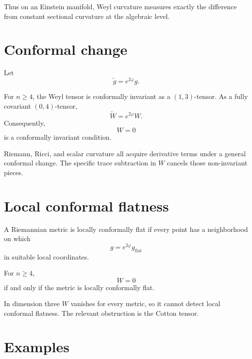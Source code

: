 Thus on an Einstein manifold, Weyl curvature measures exactly the difference from
constant sectional curvature at the algebraic level.

\section{Conformal change}

Let
\[
\widetilde g=e^{2\varphi}g.
\]

\begin{theorem}\label{thm:vii28-conformal}
For \(n\ge4\), the Weyl tensor is conformally invariant as a \((1,3)\)-tensor.
As a fully covariant \((0,4)\)-tensor,
\[
\widetilde W=e^{2\varphi}W.
\]
Consequently,
\[
W=0
\]
is a conformally invariant condition.
\end{theorem}

\begin{remark}
Riemann, Ricci, and scalar curvature all acquire derivative terms under a general
conformal change.  The specific trace subtraction in \(W\) cancels those
non-invariant pieces.
\end{remark}

\section{Local conformal flatness}

\begin{definition}\label{def:vii28-lcf}
A Riemannian metric is locally conformally flat if every point has a neighborhood
on which
\[
g=e^{2\varphi}g_{\mathrm{flat}}
\]
in suitable local coordinates.
\end{definition}

\begin{theorem}\label{thm:vii28-lcf-criterion}
For \(n\ge4\),
\[
W=0
\]
if and only if the metric is locally conformally flat.
\end{theorem}

\begin{warning}\label{warn:vii28-cotton}
In dimension three \(W\) vanishes for every metric, so it cannot detect local
conformal flatness.  The relevant obstruction is the Cotton tensor.
\end{warning}

\section{Examples}

